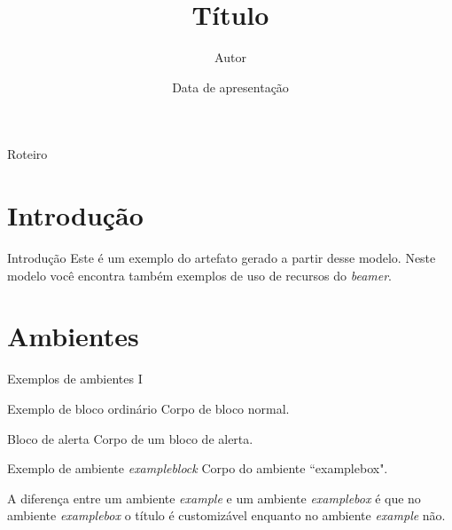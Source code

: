 \documentclass[red]{beamer}
\title{Título}
\author{Autor}
\institute[] %
{
	\inst{}
	Departamento de Computação e Sistemas de Informação\\
	Instituto de Ciências de Exatas e Aplicadas\\
	Universidade Federal de Ouro Preto
}
\date{Data de apresentação}
\begin{document}
	\label{Título}
	
	\begin{frame}
		
		\titlepage
	\end{frame}
	
	\begin{frame}[allowframebreaks]{Roteiro} %
		\tableofcontents
	\end{frame}
	
	\section{Introdução}
		\begin{frame}{Introdução}
			Este é um exemplo do artefato gerado a partir desse modelo. Neste modelo você encontra
			 também exemplos de uso de recursos do \textit{beamer}.
		\end{frame}
	
	\label{amb1}	
	\section{Ambientes}
		\begin{frame}{Exemplos de ambientes I}
			\begin{block}{Exemplo de bloco ordinário}
				Corpo de bloco normal.
			\end{block}
			
			\begin{alertblock}{Bloco de alerta}
				Corpo de um bloco de alerta.
			\end{alertblock}
			
			\begin{exampleblock}{Exemplo de ambiente \textit{exampleblock}}
				Corpo do ambiente ``examplebox".
			\end{exampleblock}
			
			\begin{example}
				A diferença entre um ambiente \textit{example} e um ambiente \textit{examplebox} é que
				no ambiente \textit{examplebox} o título é customizável enquanto no ambiente \textit{example} não. 
			\end{example}
			
		\end{frame}
		
\end{document}
